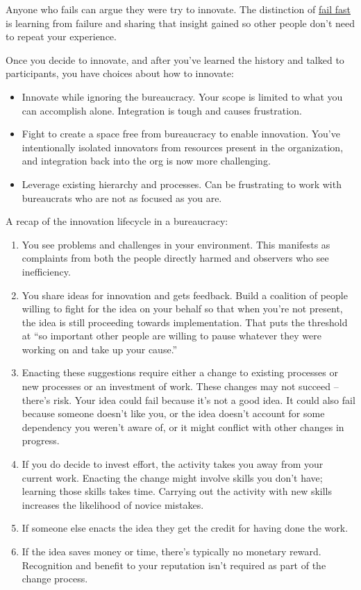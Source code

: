 Anyone who fails can argue they were try to innovate. The distinction of \href{https://en.wikipedia.org/wiki/Fail-fast#Business}{fail fast}\iftoggle{WPinmargin}{\marginpar{[Wikipedia] Fail fast}}{}
 is learning from failure and sharing that insight gained so other people don't need to repeat your experience. 


Once you decide to innovate, and after you've learned the history and talked to participants, you have choices about how to innovate:
\begin{itemize}
\item Innovate while ignoring the bureaucracy. Your scope is limited to what you can accomplish alone. Integration is tough and causes frustration.
\item Fight to create a space free from bureaucracy to enable innovation. You've intentionally isolated innovators from resources present in the organization, and integration back into the org is now more challenging. 
\item Leverage existing hierarchy and processes. Can be frustrating to work with bureaucrats who are not as focused as you are.
\end{itemize}


A recap of the innovation lifecycle in a bureaucracy:
\begin{enumerate}
    \item You see problems and challenges in your environment. This manifests as complaints from both the people directly harmed and observers who see inefficiency.
    \item You share ideas for innovation and gets feedback. Build a coalition of people willing to fight for the idea on your behalf
    so that when you're not present, the idea is still proceeding towards implementation.  That puts the threshold at ``so important other people are willing to pause whatever they were working on and take up your cause.''
    \item Enacting these suggestions require either a change to existing processes or new processes or an investment of work. These changes may not succeed -- there's risk. Your idea could fail because it's not a good idea. It could also fail because someone doesn't like you, or the idea doesn't account for some dependency you weren't aware of, or it might conflict with other changes in progress.
    \item If you do decide to invest effort, the activity takes you away from your current work. Enacting the change might involve skills you don't have; learning those skills takes time. Carrying out the activity with new skills increases the likelihood of novice mistakes.
    \item If someone else enacts the idea they get the credit for having done the work.
    \item If the idea saves money or time, there's typically no monetary reward. Recognition and benefit to your reputation isn't required as part of the change process. 
\end{enumerate}

